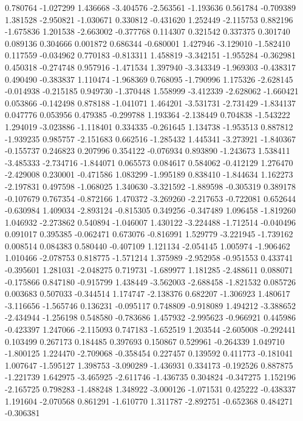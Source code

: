 0.780764
-1.027299
1.436668
-3.404576
-2.563561
-1.193636
0.561784
-0.709389
1.381528
-2.950821
-1.030671
0.330812
-0.431620
1.252449
-2.115753
0.882196
-1.675836
1.201538
-2.663002
-0.377768
0.114307
0.321542
0.337375
0.301740
0.089136
0.304666
0.001872
0.686344
-0.680001
1.427946
-3.129010
-1.582410
0.117559
-0.034962
0.770183
-0.813311
1.458819
-3.342151
-1.955284
-0.362981
0.450318
-0.274748
0.957916
-1.471534
1.397940
-3.343349
-1.969303
-0.438317
0.490490
-0.383837
1.110474
-1.968369
0.768095
-1.790996
1.175326
-2.628145
-0.014938
-0.215185
0.949730
-1.370448
1.558999
-3.412339
-2.628062
-1.660421
0.053866
-0.142498
0.878188
-1.041071
1.464201
-3.531731
-2.731429
-1.834137
0.047776
0.053956
0.479385
-0.299788
1.193364
-2.138449
0.704838
-1.543222
1.294019
-3.023886
-1.118401
0.334335
-0.261645
1.134738
-1.953513
0.887812
-1.939235
0.985757
-2.151683
0.662516
-1.285432
1.445341
-3.273921
-1.840367
-0.155737
0.246823
0.207996
0.354122
-0.076934
0.893890
-1.243673
1.538411
-3.485333
-2.734716
-1.844071
0.065573
0.084617
0.584062
-0.412129
1.276470
-2.429008
0.230001
-0.471586
1.083299
-1.995189
0.838410
-1.844634
1.162273
-2.197831
0.497598
-1.068025
1.340630
-3.321592
-1.889598
-0.305319
0.389178
-0.107679
0.767354
-0.872166
1.470372
-3.269260
-2.217653
-0.722081
0.652644
-0.630984
1.409034
-2.893124
-0.815305
0.349256
-0.347489
1.096458
-1.819260
1.046932
-2.273862
0.540894
-1.046007
1.430122
-3.224488
-1.712514
-0.040496
0.091017
0.395385
-0.062471
0.673076
-0.816991
1.529779
-3.221945
-1.739162
0.008514
0.084383
0.580440
-0.407109
1.121134
-2.054145
1.005974
-1.906462
1.010466
-2.078753
0.818775
-1.571214
1.375989
-2.952958
-0.951553
0.433741
-0.395601
1.281031
-2.048275
0.719731
-1.689977
1.181285
-2.488611
0.088071
-0.175866
0.847180
-0.915799
1.438449
-3.562003
-2.688458
-1.821532
0.085726
0.003683
0.507033
-0.344514
1.174747
-2.138376
0.682207
-1.306923
1.480617
-3.116656
-1.565746
0.136231
-0.095117
0.748809
-0.918089
1.494212
-3.388652
-2.434944
-1.256198
0.548580
-0.783686
1.457932
-2.995623
-0.966921
0.445986
-0.423397
1.247066
-2.115093
0.747183
-1.652519
1.203544
-2.605008
-0.292441
0.103499
0.267173
0.184485
0.397693
0.150867
0.529961
-0.264339
1.049710
-1.800125
1.224470
-2.709068
-0.358454
0.227457
0.139592
0.411773
-0.181041
1.007647
-1.595127
1.398753
-3.090289
-1.436931
0.334173
-0.192526
0.887875
-1.221739
1.642975
-3.465925
-2.611746
-1.436735
0.304824
-0.347275
1.152196
-2.165725
0.798283
-1.488248
1.348922
-3.000126
-1.071531
0.425222
-0.438337
1.191604
-2.070568
0.861291
-1.610770
1.311787
-2.892751
-0.652368
0.484271
-0.306381
